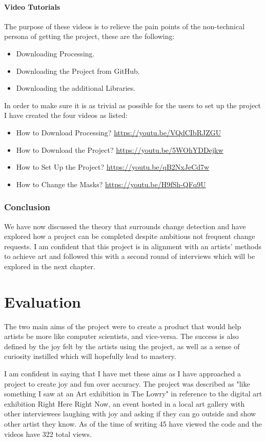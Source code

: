 \documentclass[a4paper]{report}
\begin{document}
\subsubsection{Video Tutorials}
The purpose of these videos is to relieve the pain points of the non-technical persona of getting the project, these are the following:

\begin{itemize}
\item Downloading Processing.
\item Downloading the Project from GitHub.
\item Downloading the additional Libraries.
\end{itemize}

In order to make sure it is as trivial as possible for the users to set up the project I have created the four videos as listed:

\begin{itemize}
\item How to Download Processing? \url{https://youtu.be/VQdCIbRJZGU}
\item How to Download the Project? \url{https://youtu.be/5WOhYDDejkw}
\item How to Set Up the Project? \url{https://youtu.be/qB2NxJeCd7w}
\item How to Change the Masks? \url{https://youtu.be/H9fSh-QFq9U}
\end{itemize}

\subsection{Conclusion}
We have now discussed the theory that surrounds change detection and have explored how a project can be completed despite ambitious not frequent change requests. I am confident that this project is in alignment with an artists' methods to achieve art and followed this with a second round of interviews which will be explored in the next chapter.

\chapter{Evaluation}
The two main aims of the project were to create a product that would help artists be more like computer scientists, and vice-versa. The success is also defined by the joy felt by the artists using the project, as well as a sense of curiosity instilled which will hopefully lead to mastery.

I am confident in saying that I have met these aims as I have approached a project to create joy and fun over accuracy. The project was described as "like something I saw at an Art exhibition in The Lowry" in reference to the digital art exhibition Right Here Right Now, an event hosted in a local art gallery with other interviewees laughing with joy and asking if they can go outside and show other artist they know. As of the time of writing 45 have viewed the code and the videos have 322 total views.
\end{document}
